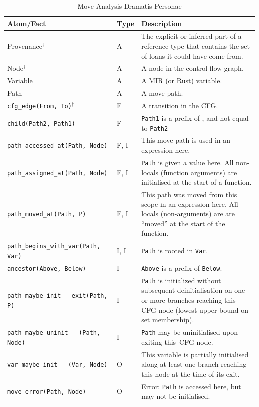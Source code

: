 \documentclass[11pt,a4paper,twoside,openany]{report}
\newcommand{\notmine}[0] {$^\dagger$}
\newcommand{\InDatalog}[1]{\texttt{#1}}
\begin{document}
{ \renewcommand{\arraystretch}{1.0}
\begin{table}[!htbp]
  \begin{tabular}{@{}l l m{5.5cm}}
    Atom/Fact & Type & Description \\ \toprule
    Provenance\notmine{} & A & The explicit or inferred part of a reference type that contains the set of loans it could have come from.  \\
    Node\notmine{} & A & A node in the control-flow graph. \\
    Variable & A & A MIR (or Rust) variable. \\
    Path & A & A move path. \\
    \InDatalog{cfg_edge(From, To)}\notmine{} & F & A transition in the CFG\@. \\
    \InDatalog{child(Path2, Path1)} & F & \InDatalog{Path1} is a prefix of-, and not equal to \InDatalog{Path2}  \\
    \InDatalog{path_accessed_at(Path, Node)} & F, I & This move path is used in an expression here.\\
    \InDatalog{path_assigned_at(Path, Node)} & F, I & \InDatalog{Path} is given a value here. All non-locals (function arguments) are initialised at the start of a function.\\
    \InDatalog{path_moved_at(Path, P)} & F, I & This path was moved from this scope in an expression here. All locals (non-arguments) are are ``moved'' at the start of the function. \\
    \InDatalog{path_begins_with_var(Path, Var)} & I, I & \InDatalog{Path} is rooted in \InDatalog{Var}.\\
    \InDatalog{ancestor(Above, Below)} & I & \InDatalog{Above} is a prefix of \InDatalog{Below}.\\
    \InDatalog{path_maybe_init___exit(Path, P)} & I & \InDatalog{Path} is initialized without subsequent deinitialisation on one or more branches reaching this CFG node (lowest upper bound on set membership).\\
    \InDatalog{path_maybe_uninit___(Path, Node)} & I & \InDatalog{Path} may be uninitialised upon exiting this~CFG node. \\
    \InDatalog{var_maybe_init___(Var, Node)} & O & This variable is partially initialised along at least one branch reaching this node at the time of its exit. \\
    \InDatalog{move_error(Path, Node)} & O & Error: \InDatalog{Path} is accessed here, but may not be initialised. \\
  \end{tabular}
\caption{Move Analysis Dramatis Personae}\label{tab:move-facts-recap}
\end{table}%
}
\end{document}
